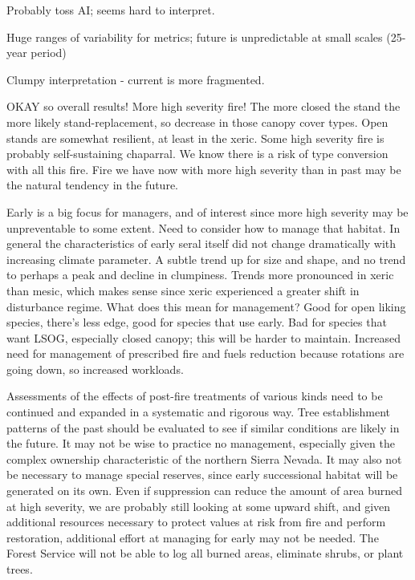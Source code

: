 \documentclass[12pt]{article}
\begin{document}
\begin{spacing}{1}
Probably toss AI; seems hard to interpret.

Huge ranges of variability for metrics; future is unpredictable at small scales (25-year period)

Clumpy interpretation - current is more fragmented. 

OKAY so overall results!
More high severity fire! The more closed the stand the more likely stand-replacement, so decrease in those canopy cover types. Open stands are somewhat resilient, at least in the xeric. Some high severity fire is probably self-sustaining chaparral. We know there is a risk of type conversion with all this fire. Fire we have now with more high severity than in past may be the natural tendency in the future. 

Early is a big focus for managers, and of interest since more high severity may be unpreventable to some extent. Need to consider how to manage that habitat. In general the characteristics of early seral itself did not change dramatically with increasing climate parameter. A subtle trend up for size and shape, and no trend to perhaps a peak and decline in clumpiness. Trends more pronounced in xeric than mesic, which makes sense since xeric experienced a greater shift in disturbance regime. 
What does this mean for management? Good for open liking species, there's less edge, good for species that use early. Bad for species that want LSOG, especially closed canopy; this will be harder to maintain. Increased need for management of prescribed fire and fuels reduction because rotations are going down, so increased workloads. 

Assessments of the effects of post-fire treatments of various kinds need to be continued and expanded in a systematic and rigorous way. Tree establishment patterns of the past should be evaluated to see if similar conditions are likely in the future. It may not be wise to practice no management, especially given the complex ownership characteristic of the northern Sierra Nevada. It may also not be necessary to manage special reserves, since early successional habitat will be generated on its own. Even if suppression can reduce the amount of area burned at high severity, we are probably still looking at some upward shift, and given additional resources necessary to protect values at risk from fire and perform restoration, additional effort at managing for early may not be needed. The Forest Service will not be able to log all burned areas, eliminate shrubs, or plant trees. 

%

% 
% 

\end{spacing}
\end{document}
